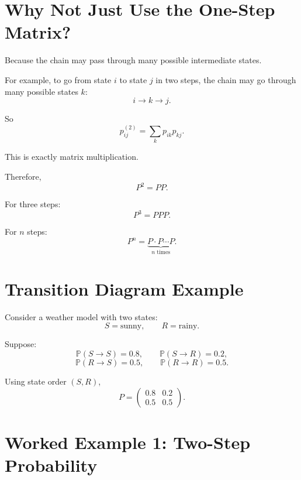 \documentclass[12pt,a4paper]{article}
\theoremstyle{notestyle}
\newcommand{\Prob}{\mathbb{P}}
\begin{document}
\section{Why Not Just Use the One-Step Matrix?}

Because the chain may pass through many possible intermediate states.

For example, to go from state $i$ to state $j$ in two steps, the chain may go through many possible states $k$:
\[
i\to k\to j.
\]

So
\[
p_{ij}^{(2)}
=
\sum_k p_{ik}p_{kj}.
\]

This is exactly matrix multiplication.

Therefore,
\[
P^2=PP.
\]

For three steps:
\[
P^3=PPP.
\]

For $n$ steps:
\[
P^n=\underbrace{P\cdot P\cdots P}_{n\text{ times}}.
\]

\section{Transition Diagram Example}

Consider a weather model with two states:
\[
S=\text{sunny},\qquad R=\text{rainy}.
\]

Suppose:
\[
\Prob(S\to S)=0.8,\qquad \Prob(S\to R)=0.2,
\]
\[
\Prob(R\to S)=0.5,\qquad \Prob(R\to R)=0.5.
\]

\begin{center}
\end{center}

Using state order $(S,R)$,
\[
P=
\begin{pmatrix}
0.8 & 0.2\\
0.5 & 0.5
\end{pmatrix}.
\]

\section{Worked Example 1: Two-Step Probability}
\end{document}
